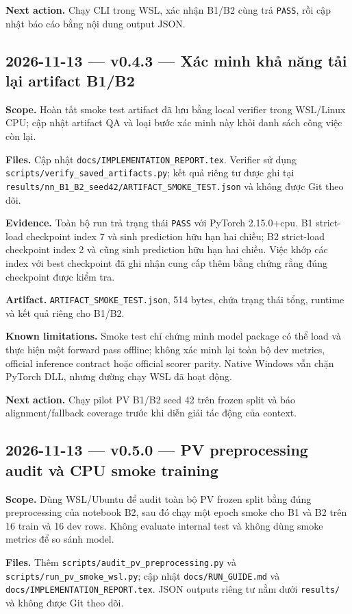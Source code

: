 \documentclass[11pt,a4paper]{article}
\newcommand{\code}[1]{\nolinkurl{#1}}
\begin{document}
\textbf{Next action.} Chạy CLI trong WSL, xác nhận B1/B2 cùng trả \code{PASS}, rồi cập nhật báo cáo bằng nội dung output JSON.

\subsection*{2026-11-13 --- v0.4.3 --- Xác minh khả năng tải lại artifact B1/B2}

\textbf{Scope.} Hoàn tất smoke test artifact đã lưu bằng local verifier trong WSL/Linux CPU; cập nhật artifact QA và loại bước xác minh này khỏi danh sách công việc còn lại.

\textbf{Files.} Cập nhật \code{docs/IMPLEMENTATION_REPORT.tex}. Verifier sử dụng \code{scripts/verify_saved_artifacts.py}; kết quả riêng tư được ghi tại \code{results/nn_B1_B2_seed42/ARTIFACT_SMOKE_TEST.json} và không được Git theo dõi.

\textbf{Evidence.} Toàn bộ run trả trạng thái \code{PASS} với PyTorch 2.15.0+cpu. B1 strict-load checkpoint index 7 và sinh prediction hữu hạn hai chiều; B2 strict-load checkpoint index 2 và cũng sinh prediction hữu hạn hai chiều. Việc khớp các index với best checkpoint đã ghi nhận cung cấp thêm bằng chứng rằng đúng checkpoint được kiểm tra.

\textbf{Artifact.} \code{ARTIFACT_SMOKE_TEST.json}, 514 bytes, chứa trạng thái tổng, runtime và kết quả riêng cho B1/B2.

\textbf{Known limitations.} Smoke test chỉ chứng minh model package có thể load và thực hiện một forward pass offline; không xác minh lại toàn bộ dev metrics, official inference contract hoặc official scorer parity. Native Windows vẫn chặn PyTorch DLL, nhưng đường chạy WSL đã hoạt động.

\textbf{Next action.} Chạy pilot PV B1/B2 seed 42 trên frozen split và báo alignment/fallback coverage trước khi diễn giải tác động của context.

\subsection*{2026-11-13 --- v0.5.0 --- PV preprocessing audit và CPU smoke training}

\textbf{Scope.} Dùng WSL/Ubuntu để audit toàn bộ PV frozen split bằng đúng preprocessing của notebook B2, sau đó chạy một epoch smoke cho B1 và B2 trên 16 train và 16 dev rows. Không evaluate internal test và không dùng smoke metrics để so sánh model.

\textbf{Files.} Thêm \code{scripts/audit_pv_preprocessing.py} và \code{scripts/run_pv_smoke_wsl.py}; cập nhật \code{docs/RUN_GUIDE.md} và \code{docs/IMPLEMENTATION_REPORT.tex}. JSON outputs riêng tư nằm dưới \code{results/} và không được Git theo dõi.
\end{document}
